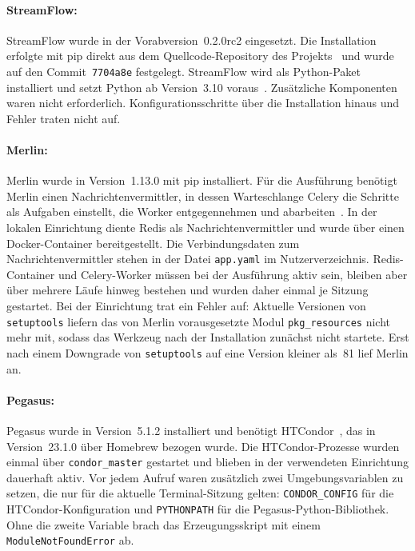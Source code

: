\paragraph{StreamFlow:} StreamFlow wurde in der Vorabversion~0.2.0rc2
eingesetzt. Die Installation erfolgte mit pip direkt aus dem
Quellcode-Repository des Projekts~\cite{streamflowrepo} und wurde auf
den Commit~\texttt{7704a8e} festgelegt. StreamFlow wird als
Python-Paket installiert und setzt Python ab Version~3.10
voraus~\cite{streamflowdocs}. Zusätzliche Komponenten waren nicht
erforderlich. Konfigurationsschritte über die
Installation hinaus und Fehler traten nicht auf.

\paragraph{Merlin:} Merlin wurde in Version~1.13.0 mit pip
installiert. Für die Ausführung benötigt Merlin einen
Nachrichtenvermittler, in dessen Warteschlange Celery die Schritte
als Aufgaben einstellt, die Worker entgegennehmen und
abarbeiten~\cite{merlindocs-celery}. In der lokalen Einrichtung diente Redis als Nachrichtenvermittler und wurde über einen Docker-Container bereitgestellt. Die Verbindungsdaten zum Nachrichtenvermittler stehen in der Datei \texttt{app.yaml} im Nutzerverzeichnis. Redis-Container und Celery-Worker müssen bei der Ausführung aktiv sein, bleiben aber über mehrere Läufe hinweg bestehen und wurden
daher einmal je Sitzung gestartet. Bei der Einrichtung trat ein
Fehler auf: Aktuelle Versionen von \texttt{setuptools} liefern das
von Merlin vorausgesetzte Modul \texttt{pkg\_resources} nicht mehr
mit, sodass das Werkzeug nach der Installation zunächst nicht
startete. Erst nach einem Downgrade von \texttt{setuptools} auf eine
Version kleiner als~81 lief Merlin an.

\begin{sloppypar}
\paragraph{Pegasus:} Pegasus wurde in Version~5.1.2 installiert und
benötigt HTCondor~\cite{pegasusdocs-install}, das in Version~23.1.0 über
Homebrew bezogen wurde. Die HTCondor-Prozesse wurden einmal über
\texttt{condor\_master} gestartet und blieben in der verwendeten
Einrichtung dauerhaft aktiv. Vor jedem Aufruf waren zusätzlich zwei
Umgebungsvariablen zu setzen, die nur für die aktuelle
Terminal-Sitzung gelten: \texttt{CONDOR\_CONFIG} für die
HTCondor-Konfiguration und \texttt{PYTHONPATH} für die
Pegasus-Python-Bibliothek. Ohne die zweite Variable brach das
Erzeugungsskript mit einem \texttt{ModuleNotFoundError} ab.
\end{sloppypar}

